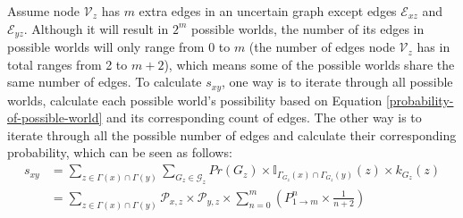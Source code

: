 \documentclass[\main/thesis.tex]{subfiles}
\begin{document}
Assume node $\mathcal{V}_z$ has $m$ extra edges in an uncertain graph except edges $\mathcal{E}_{xz}$ and $\mathcal{E}_{yz}$. Although it will result in $2^m$ possible worlds, the number of its edges in possible worlds will only range from 0 to $m$ (the number of edges node $\mathcal{V}_z$ has in total ranges from 2 to $m+2$), which means some of the possible worlds share the same number of edges. To calculate $s_{xy}$, one way is to iterate through all possible worlds, calculate each possible world's possibility based on Equation \ref{probability-of-possible-world} and its corresponding count of edges. The other way is to iterate through all the possible number of edges and calculate their corresponding probability, which can be seen as follows:
\begin{align*}
s_{xy}&=\sum_{z\in \Gamma(x)\cap\Gamma(y)}\sum_{{G_z}\in \mathcal{G}_z}Pr({G_z})\times\mathbb{I}_{\Gamma_{G_z}(x)\cap\Gamma_{G_z}(y)}(z)\times k_{G_z}(z)\\
&=\sum_{z\in \Gamma(x)\cap\Gamma(y)}\mathcal{P}_{x,z}\times\mathcal{P}_{y,z} \times \sum_{n=0}^{m}(P_{1\rightarrow m}^n \times \frac{1}{n+2})
\end{align*}


\end{document}
